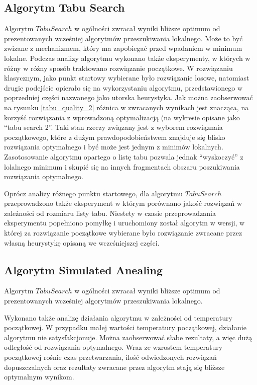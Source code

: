 \subsection {Algorytm Tabu Search}

Algorytm $Tabu Search$ w ogólności zwracał wyniki bliższe optimum od
prezentowanych wcześniej algorytmów przeszukiwania lokalnego. Może to być
zwizane z mechanizmem, który ma zapobiegać przed wpadaniem w minimum
lokalne. Podczas analizy algorytmu wykonano także eksperymenty, w których
w różny w różny sposób traktowano rozwiązanie początkowe. W rozwiązaniu
klasycznym, jako punkt startowy wybierane było rozwiązanie losowe,
natomiast drugie podejście opierało się na wykorzystaniu algorytmu,
przedstawionego w poprzedniej części nazwanego jako utorska heurystyka.
Jak można zaobserwować na rysunku \ref{tabu_quality_2} różnica w
zwracanych wynikach jest znacząca, na korzyść rozwiązania z wprowadzoną
optymalizacją (na wykresie opisane jako ``tabu search 2''.
Taki stan rzeczy związany jest z wyborem rozwiąznaia początkowego,
które z dużym prawdopodobieństwem znajduje się blisko rozwiązania
optymalnego i być może jest jednym z minimów lokalnych. Zasotosowanie
algorytmu opartego o listę tabu pozwala jednak ``wyskoczyć'' z lolalnego
minimum i skupić się na innych fragmentach obszaru poszukiwania
rozwiązania optymalnego.

Oprócz analizy różnego punktu startowego, dla algorytmu $Tabu Search$
przeprowadzono także eksperyment w którym porównano jakość rozwiązań
w zależności od rozmiaru listy tabu. Niestety w czasie przeprowadzania
eksperymentu popełniono pomyłkę i uruchomiony został algorytm w wersji,
w której za rozwiązanie początkowe wybierane było rozwiązanie zwracane
przez własną heurystykę opisaną we wcześniejszej części.


\subsection {Algorytm Simulated Anealing}

Algorytm $Tabu Search$ w ogólności zwracał wyniki bliższe optimum od
prezentowanych wcześniej algorytmów przeszukiwania lokalnego.

Wykonano także analizę działania algorytmu w zależności od temperatury
początkowej. W przypadku małej wartości temperatury początkowej,
działanie algorytmu nie satysfakcjonuje. Można zaobserwować słabe
rezultaty, a więc dużą odległość od rozwiązania optymalnego. Wraz
ze wzrostem temperatury początkowej rośnie czas przetwarzania, ilość
odwiedzonych rozwiązań dopuszczalnych oraz rezultaty zwracane przez
algorytm stają się bliższe optymalnym wynikom.

